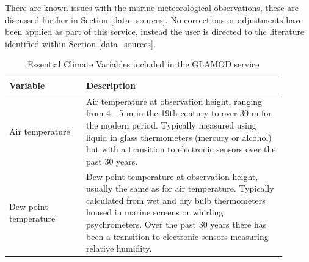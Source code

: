 There are known issues with the marine meteorological observations, these are discussed further in Section \ref{data_sources}.
No corrections or adjustments have been applied as part of this service, instead the user is directed to the literature identified within Section \ref{data_sources}.
\begin{table}
\centering
\caption{Essential Climate Variables included in the GLAMOD service}
\label{tab:ecvs}
\begin{tabular}{|p{0.25\linewidth}|p{0.65\linewidth}|}
\hline
\bfseries Variable & \bfseries Description \\ 
\hline
Air temperature & Air temperature at observation height, ranging from 4 - 5 m in the 19th century to over 30 m for the modern period. Typically measured using liquid in glass thermometers (mercury or alcohol) but with a transition to electronic sensors over the past 30 years.\\
\hline
Dew point temperature & Dew point temperature at observation height, usually the same as for air temperature. Typically calculated from wet and dry bulb thermometers housed in marine screens or whirling psychrometers. Over the past 30 years there has been a transition to electronic sensors measuring relative humidity.\\
\hline

\end{tabular}
\end{table}
